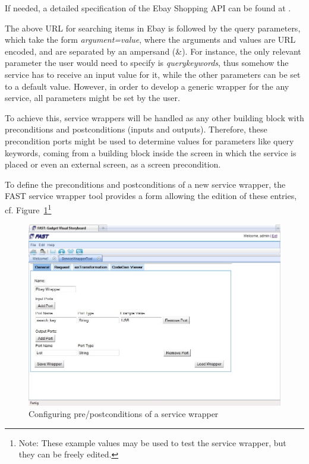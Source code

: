 \documentclass{fast_latex}
\begin{document}
If needed, a detailed specification of the Ebay Shopping API can be found at \cite{eBayShoppingAPIs}.

The above URL for searching items in Ebay is followed by the query parameters, which take the form \textit{argument=value}, where the arguments and values are URL encoded, and are separated by an ampersand (\&). For instance, the only relevant parameter the user would need to specify is \emph{querykeywords}, thus somehow the service has to receive an input value for it, while the other parameters can be set to a default value. However, in order to develop a generic wrapper for the any service, all parameters might be set by the user.

To achieve this, service wrappers will be handled as any other building block with preconditions and postconditions (inputs and outputs). Therefore, these precondition ports might be used to determine values for parameters like query keywords, coming from a building block inside the screen in which the service is placed or even an external screen, as a screen precondition.

To define the preconditions and postconditions of a new service wrapper, the FAST service wrapper tool provides a form allowing the edition of these entries, cf. Figure~\ref{fig:construct_pre_post_conditions}\footnote{Note: These example values may be used to test the service wrapper, but they can be freely edited.} 

\begin{figure}[!htb]
  \begin{center}
    \includegraphics[width=\linewidth]{images/ServiceWrapperToolGVSWithPortDefinitions.jpg}
    \caption{Configuring pre/postconditions of a service wrapper}
    \label{fig:construct_pre_post_conditions}
  \end{center}
\end{figure}
\end{document}
